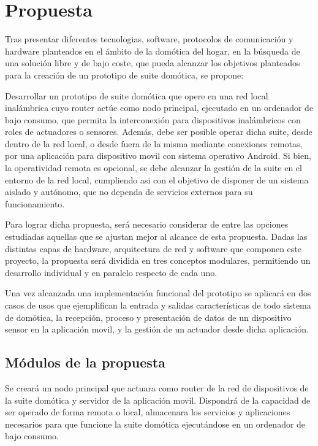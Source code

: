 \cleardoublepage

\chapter{Propuesta}
\label{ch:Capitulo3}

Tras presentar diferentes tecnologias, software, protocolos de comunicación y hardware planteados en el ámbito de la domótica del hogar, en la búsqueda de una solución libre y de bajo coste, que pueda alcanzar los objetivos planteados para la creación de un prototipo de suite domótica, se propone:

Desarrollar un prototipo de suite domótica que opere en una red local inalámbrica cuyo router actúe como nodo principal, ejecutado en un ordenador de bajo consumo, que permita la interconexión para dispositivos inalámbricos con roles de actuadores o sensores. Además, debe ser posible operar dicha suite, desde dentro de la red local, o desde fuera de la misma mediante conexiones remotas, por una aplicación para dispositivo movil con sistema operativo Android. Si bien, la operatividad remota es opcional, se debe alcanzar la gestión de la suite en el entorno de la red local, cumpliendo asi con el objetivo de disponer de un sistema aislado y autónomo, que no dependa de servicios externos para su funcionamiento.

Para lograr dicha propuesta, será necesario considerar de entre las opciones estudiadas aquellas que se ajustan mejor al alcance de esta propuesta. Dadas las distintas capas de hardware, arquitectura de red y software que componen este proyecto, la propuesta será dividida en tres conceptos modulares, permitiendo un desarrollo individual y en paralelo respecto de cada uno.

Una vez alcanzada una implementación funcional del prototipo se aplicará en dos casos de usos que ejemplifican la entrada y salidas características de todo sistema de domótica, la recepción, proceso y presentación de datos de un dispositivo sensor en la aplicación movil, y la gestión de un actuador desde dicha aplicación.

\section{Módulos de la propuesta}
\label{ch:Capitulo3.2}

Se creará un nodo principal que actuara como router de la red de dispositivos de la suite domótica y servidor de la aplicación movil. Dispondrá de la capacidad de ser operado de forma remota o local, almacenara los servicios y aplicaciones necesarios para que funcione la suite domótica ejecutándose en un ordenador de bajo consumo.


